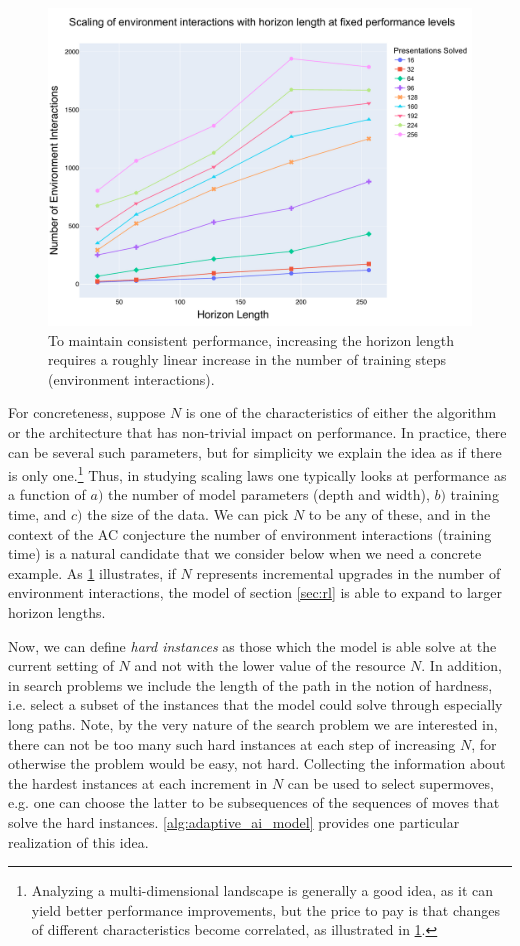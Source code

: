 \begin{figure}
	\centering
	\includegraphics[scale=0.35]{fig/env_vs_horizon.pdf}
	\caption{To maintain consistent performance, increasing the horizon length requires a roughly linear increase in the number of training steps (environment interactions).}
	\label{fig:env_vs_horizon}
\end{figure}

For concreteness, suppose $N$ is one of the characteristics of either the algorithm or the architecture that has non-trivial impact on performance. In practice, there can be several such parameters, but for simplicity we explain the idea as if there is only one.\footnote{Analyzing a multi-dimensional landscape is generally a good idea, as it can yield better performance improvements, but the price to pay is that changes of different characteristics become correlated, as illustrated in \cref{fig:env_vs_horizon}.} Thus, in studying scaling laws one typically looks at performance as a function of $a)$ the number of model parameters (depth and width), $b)$ training time, and $c)$ the size of the data. We can pick $N$ to be any of these, and in the context of the AC conjecture the number of environment interactions (training time) is a natural candidate that we consider below when we need a concrete example. As \cref{fig:env_vs_horizon} illustrates, if $N$ represents incremental upgrades in the number of environment interactions, the model of section \cref{sec:rl} is able to expand to larger horizon lengths.

Now, we can define \textit{hard instances} as those which the model is able solve at the current setting of $N$ and not with the lower value of the resource $N$. In addition, in search problems we include the length of the path in the notion of hardness, i.e. select a subset of the instances that the model could solve through especially long paths. Note, by the very nature of the search problem we are interested in, there can not be too many such hard instances at each step of increasing $N$, for otherwise the problem would be easy, not hard. Collecting the information about the hardest instances at each increment in $N$ can be used to select supermoves, e.g. one can choose the latter to be subsequences of the sequences of moves that solve the hard instances. \cref{alg:adaptive_ai_model} provides one particular realization of this idea.

